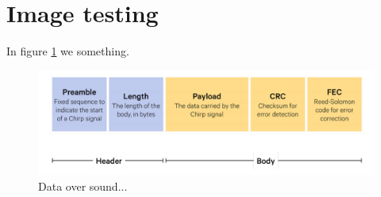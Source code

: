 \section{Image testing}

In figure \ref{fig:dos} we something.

\begin{figure}[!h]
    \includegraphics[width=\linewidth]{res/dos_message.png}
    \caption{Data over sound...}
    \label{fig:dos}
\end{figure}
